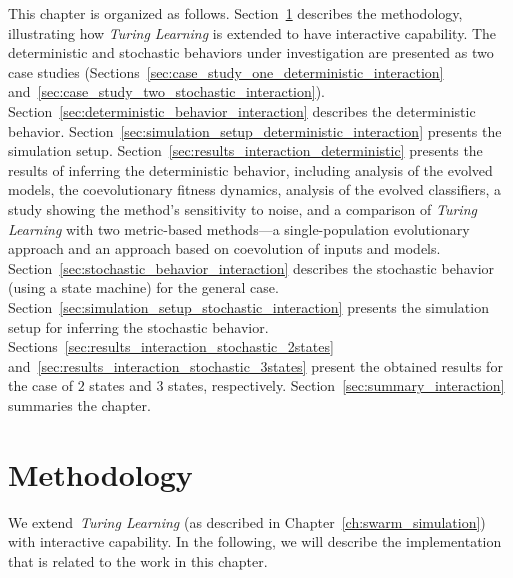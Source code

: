 This chapter is organized as follows. Section~\ref{sec:methodology_interaction} describes the methodology, illustrating how \textit{Turing Learning} is extended to have interactive capability. The deterministic and stochastic behaviors under investigation are presented as two case studies (Sections~\ref{sec:case_study_one_deterministic_interaction} and~\ref{sec:case_study_two_stochastic_interaction}). Section~\ref{sec:deterministic_behavior_interaction} describes the deterministic behavior. Section~\ref{sec:simulation_setup_deterministic_interaction} presents the simulation setup. Section~\ref{sec:results_interaction_deterministic} presents the results of inferring the deterministic behavior, including analysis of the evolved models, the coevolutionary fitness dynamics, analysis of the evolved classifiers, a study showing the method's sensitivity to noise, and a comparison of \textit{Turing Learning} with two metric-based methods---a single-population evolutionary approach and an approach based on coevolution of inputs and models. Section~\ref{sec:stochastic_behavior_interaction} describes the stochastic behavior (using a state machine) for the general case. Section~\ref{sec:simulation_setup_stochastic_interaction} presents the simulation setup for inferring the stochastic behavior. Sections~\ref{sec:results_interaction_stochastic_2states} and~\ref{sec:results_interaction_stochastic_3states} present the obtained results for the case of $2$ states and $3$ states, respectively. Section~\ref{sec:summary_interaction} summaries the chapter.

\section{Methodology}\label{sec:methodology_interaction}

We extend~\textit{Turing Learning} (as described in Chapter~\ref{ch:swarm_simulation}) with interactive capability. In the following, we will describe the implementation that is related to the work in this chapter.

